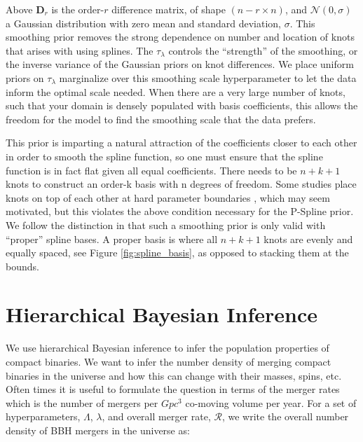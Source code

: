 \noindent Above $\bm{D}_r$ is the order-$r$ difference matrix, of shape $(n-r \times n)$, and $\mathcal{N}(0,\sigma)$ a Gaussian distribution with zero mean 
and standard deviation, $\sigma$. This smoothing prior removes the strong dependence on number and location of knots that arises with using splines. 
The $\tau_\lambda$ controls the ``strength'' of the smoothing, or the inverse variance of the Gaussian priors on knot differences. We 
place uniform priors on $\tau_\lambda$ marginalize over this smoothing scale hyperparameter to let the data inform the optimal scale needed.
When there are a very large number of knots, such that your domain is densely populated with basis coefficients, this allows the freedom for the model to find the smoothing 
scale that the data prefers. 

This prior is imparting a natural attraction of the coefficients closer to each other in order to smooth the spline function, so one 
must ensure that the spline function is in fact flat given all equal coefficients. There needs to be $n+k+1$ knots to construct an order-k 
basis with n degrees of freedom. Some studies place knots on top of each other at hard parameter boundaries \citep{deBoor78,monotone_regression_splines}, 
which may seem motivated, but this violates the above condition necessary for the P-Spline prior. We follow the distinction in \citet{eilers2021practical} 
that such a smoothing prior is only valid with ``proper'' spline bases. A proper basis is where all $n+k+1$ knots are evenly and equally spaced, 
see Figure \ref{fig:spline_basis}, as opposed to stacking them at the bounds.

\section{Hierarchical Bayesian Inference} \label{sec:hierarchical_inference}

We use hierarchical Bayesian inference to infer the population properties of compact binaries. We want to infer the number density of merging compact binaries  
in the universe and how this can change with their masses, spins, etc. Often times it is useful to formulate the question in terms of the 
merger rates which is the number of mergers per $Gpc^{3}$ co-moving volume per year. For a set of hyperparameters, $\Lambda$, $\lambda$, and overall 
merger rate, $\mathcal{R}$, we write the overall number density of BBH mergers in the universe as: 

